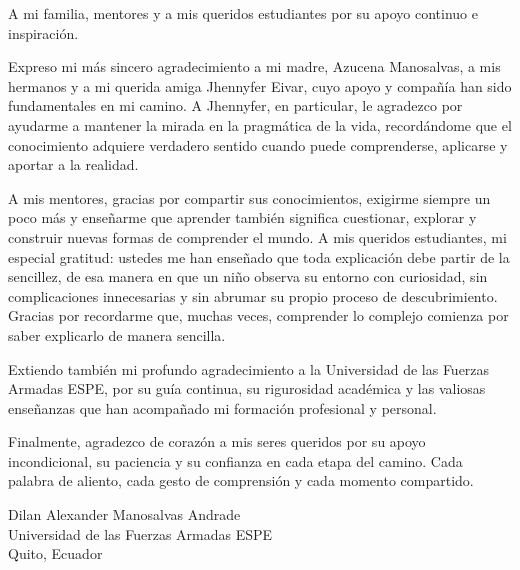 \documentclass[a4paper, nobind]{templates/ociamthesis}
\begin{document}
\begin{romanpages}

\maketitle

\begin{dedication}
  A mi familia, mentores y a mis queridos estudiantes por su apoyo continuo e inspiración.
\end{dedication}



\begin{acknowledgements}
 	Expreso mi más sincero agradecimiento a mi madre, Azucena Manosalvas, a mis hermanos y a mi querida amiga Jhennyfer Eivar, cuyo apoyo y compañía han sido fundamentales en mi camino. A Jhennyfer, en particular, le agradezco por ayudarme a mantener la mirada en la pragmática de la vida, recordándome que el conocimiento adquiere verdadero sentido cuando puede comprenderse, aplicarse y aportar a la realidad.

 A mis mentores, gracias por compartir sus conocimientos, exigirme siempre un poco más y enseñarme que aprender también significa cuestionar, explorar y construir nuevas formas de comprender el mundo. A mis queridos estudiantes, mi especial gratitud: ustedes me han enseñado que toda explicación debe partir de la sencillez, de esa manera en que un niño observa su entorno con curiosidad, sin complicaciones innecesarias y sin abrumar su propio proceso de descubrimiento. Gracias por recordarme que, muchas veces, comprender lo complejo comienza por saber explicarlo de manera sencilla.

 Extiendo también mi profundo agradecimiento a la Universidad de las Fuerzas Armadas ESPE, por su guía continua, su rigurosidad académica y las valiosas enseñanzas que han acompañado mi formación profesional y personal.

 Finalmente, agradezco de corazón a mis seres queridos por su apoyo incondicional, su paciencia y su confianza en cada etapa del camino. Cada palabra de aliento, cada gesto de comprensión y cada momento compartido.

 \begin{flushright}
 Dilan Alexander Manosalvas Andrade \\
 Universidad de las Fuerzas Armadas ESPE \\
 Quito, Ecuador
 \end{flushright}
\end{acknowledgements}




\end{romanpages}
\end{document}
